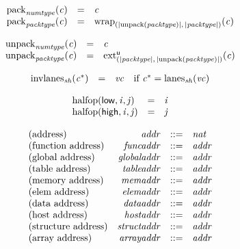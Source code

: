 \vspace{1ex}

$$
\begin{array}{@{}lcl@{}l@{}}
{{\mathrm{pack}}}_{{\mathit{numtype}}}({\mathit{c}}) &=& {\mathit{c}} &  \\
{{\mathrm{pack}}}_{{\mathit{packtype}}}({\mathit{c}}) &=& {{{\mathrm{wrap}}}_{({|{\mathrm{unpack}}({\mathit{packtype}})|},\, {|{\mathit{packtype}}|})}}{({\mathit{c}})} &  \\
\end{array}
$$

$$
\begin{array}{@{}lcl@{}l@{}}
{{\mathrm{unpack}}}_{{\mathit{numtype}}}({\mathit{c}}) &=& {\mathit{c}} &  \\
{{\mathrm{unpack}}}_{{\mathit{packtype}}}({\mathit{c}}) &=& {{{{\mathrm{ext}}}_{({|{\mathit{packtype}}|},\, {|{\mathrm{unpack}}({\mathit{packtype}})|})}^{\mathsf{u}}}}{({\mathit{c}})} &  \\
\end{array}
$$

\vspace{1ex}

$$
\begin{array}{@{}lcl@{}l@{}}
{{\mathrm{invlanes}}}_{{\mathit{sh}}}({{\mathit{c}}^\ast}) &=& {\mathit{vc}} &\quad
  \mbox{if}~{{\mathit{c}}^\ast} = {{\mathrm{lanes}}}_{{\mathit{sh}}}({\mathit{vc}}) \\
\end{array}
$$

$$
\begin{array}{@{}lcl@{}l@{}}
{\mathrm{halfop}}(\mathsf{low}, {\mathit{i}}, {\mathit{j}}) &=& {\mathit{i}} &  \\
{\mathrm{halfop}}(\mathsf{high}, {\mathit{i}}, {\mathit{j}}) &=& {\mathit{j}} &  \\
\end{array}
$$

$$
\begin{array}{@{}lrrl@{}l@{}}
\mbox{(address)} & {\mathit{addr}} &::=& {\mathit{nat}} \\
\mbox{(function address)} & {\mathit{funcaddr}} &::=& {\mathit{addr}} \\
\mbox{(global address)} & {\mathit{globaladdr}} &::=& {\mathit{addr}} \\
\mbox{(table address)} & {\mathit{tableaddr}} &::=& {\mathit{addr}} \\
\mbox{(memory address)} & {\mathit{memaddr}} &::=& {\mathit{addr}} \\
\mbox{(elem address)} & {\mathit{elemaddr}} &::=& {\mathit{addr}} \\
\mbox{(data address)} & {\mathit{dataaddr}} &::=& {\mathit{addr}} \\
\mbox{(host address)} & {\mathit{hostaddr}} &::=& {\mathit{addr}} \\
\mbox{(structure address)} & {\mathit{structaddr}} &::=& {\mathit{addr}} \\
\mbox{(array address)} & {\mathit{arrayaddr}} &::=& {\mathit{addr}} \\
\end{array}
$$

